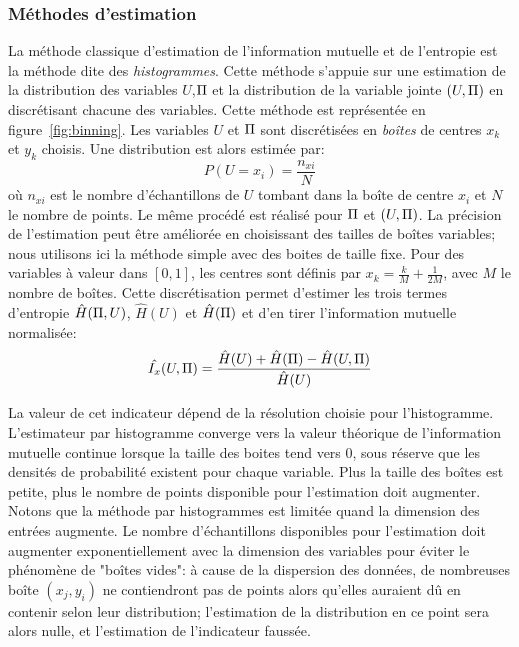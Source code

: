 \documentclass[../main]{subfiles}
\begin{document}
\subsubsection{Méthodes d'estimation}

La méthode classique d'estimation de l'information mutuelle et de l'entropie est la méthode dite des \emph{histogrammes}.
Cette méthode s'appuie sur une estimation de la distribution des variables $U$,$\Pi$ et la distribution de la variable jointe $(U,\Pi)$ en discrétisant chacune des variables.
Cette méthode est représentée en figure~\ref{fig:binning}. Les variables $U$ et $\Pi$ sont discrétisées en \emph{boîtes} de centres $x_k$ et $y_k$ choisis.
Une distribution est alors estimée par: 
$$P(U = x_i) = \frac{n_{xi}}{N} $$ où $n_{xi}$ est le nombre d'échantillons de $U$ tombant dans la boîte de centre $x_i$ et $N$ le nombre de points. Le même procédé est réalisé pour $\Pi$ et $(U,\Pi)$. La précision de l'estimation peut être améliorée en choisissant des tailles de boîtes variables; nous utilisons ici la méthode simple avec des boites de taille fixe.
Pour des variables à valeur dans $[0,1]$, les centres sont définis par $x_k = \frac{k}{M}+\frac{1}{2M}$, avec $M$ le nombre de boîtes.
Cette discrétisation permet d'estimer les trois termes d'entropie $\hat{H}(\Pi,U)$, $\hat{H}(U)$ et $\hat{H}(\Pi)$ et d'en tirer l'information mutuelle normalisée:
\begin{equation}
    \hat{I_x}(U,\Pi) = \frac{\hat{H}(U) + \hat{H}(\Pi) - \hat{H}(U,\Pi)}{\hat{H}(U)}
   \end{equation}

La valeur de cet indicateur dépend de la résolution choisie pour l'histogramme. L'estimateur  par histogramme converge vers la valeur théorique de l'information mutuelle continue lorsque la taille des boites tend vers 0, sous réserve que les densités de probabilité existent pour chaque variable. Plus la taille des boîtes est petite, plus le nombre de points disponible pour l'estimation doit augmenter.
Notons que la méthode par histogrammes est limitée quand la dimension des entrées augmente.
Le nombre d'échantillons disponibles pour l'estimation doit augmenter exponentiellement avec la dimension des variables pour éviter le phénomène de "boîtes vides": à cause de la dispersion des données, de nombreuses boîte $(x_j,y_i)$ ne contiendront pas de points alors qu'elles auraient dû en contenir selon leur distribution; l'estimation de la distribution en ce point sera alors nulle, et l'estimation de l'indicateur faussée.
\end{document}
